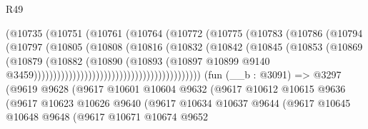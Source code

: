 \begin{lexlean}{R49}
\begin{coremodule}
                                            (@10735
                                              (@10751
                                                (@10761
                                                  (@10764
                                                    (@10772
                                                      (@10775
                                                        (@10783
                                                          (@10786
                                                            (@10794
                                                              (@10797
                                                                (@10805
                                                                  (@10808
                                                                    (@10816
                                                                      (@10832
                                                                        (@10842
                                                                          (@10845
                                                                            (@10853
                                                                              (@10869
                                                                                (@10879
                                                                                  (@10882
                                                                                    (@10890
                                                                                      (@10893
                                                                                        (@10897
                                                                                          @10899
                                                                                          @9140
                                                                                          @3459)))))))))))))))))))))))))))))))))))))))))))
    (fun (__b : @3091) =>
    @3297
      (@9619
        @9628
        (@9617
          @10601
          @10604
          @9632
          (@9617
            @10612
            @10615
            @9636
            (@9617
              @10623
              @10626
              @9640
              (@9617
                @10634
                @10637
                @9644
                (@9617
                  @10645
                  @10648
                  @9648
                  (@9617
                    @10671
                    @10674
                    @9652

\end{coremodule}
\end{lexlean}
